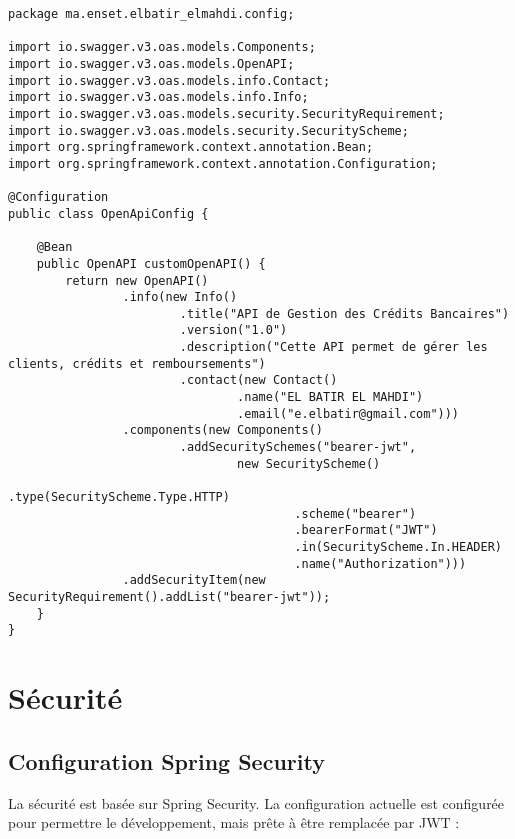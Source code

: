 \begin{lstlisting}[caption=Configuration Swagger via OpenApiConfig]
package ma.enset.elbatir_elmahdi.config;

import io.swagger.v3.oas.models.Components;
import io.swagger.v3.oas.models.OpenAPI;
import io.swagger.v3.oas.models.info.Contact;
import io.swagger.v3.oas.models.info.Info;
import io.swagger.v3.oas.models.security.SecurityRequirement;
import io.swagger.v3.oas.models.security.SecurityScheme;
import org.springframework.context.annotation.Bean;
import org.springframework.context.annotation.Configuration;

@Configuration
public class OpenApiConfig {

    @Bean
    public OpenAPI customOpenAPI() {
        return new OpenAPI()
                .info(new Info()
                        .title("API de Gestion des Crédits Bancaires")
                        .version("1.0")
                        .description("Cette API permet de gérer les clients, crédits et remboursements")
                        .contact(new Contact()
                                .name("EL BATIR EL MAHDI")
                                .email("e.elbatir@gmail.com")))
                .components(new Components()
                        .addSecuritySchemes("bearer-jwt",
                                new SecurityScheme()
                                        .type(SecurityScheme.Type.HTTP)
                                        .scheme("bearer")
                                        .bearerFormat("JWT")
                                        .in(SecurityScheme.In.HEADER)
                                        .name("Authorization")))
                .addSecurityItem(new SecurityRequirement().addList("bearer-jwt"));
    }
}
\end{lstlisting}

\section{Sécurité}
\subsection{Configuration Spring Security}
La sécurité est basée sur Spring Security. La configuration actuelle est configurée pour permettre le développement, mais prête à être remplacée par JWT :

